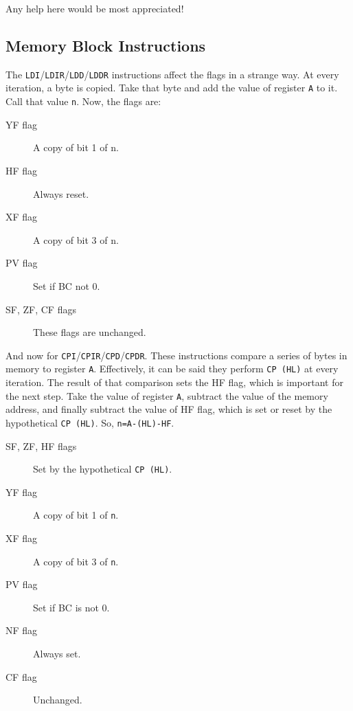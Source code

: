 Any help here would be most appreciated!


\subsection{Memory Block Instructions \cite{mrison}}
\label{block_mem}

The {\tt LDI}/{\tt LDIR}/{\tt LDD}/{\tt LDDR} instructions affect the flags in a strange way. At every iteration, a byte is copied. Take that byte and add the value of register {\tt A} to it. Call that value {\tt n}. Now, the flags are:

\begin{description}
 
	\item[YF flag]
	A copy of bit 1 of n.

	\item[HF flag]
	Always reset.

	\item[XF flag]
	A copy of bit 3 of n.

	\item[PV flag]
	Set if BC not 0.

	\item[SF, ZF, CF flags]
	These flags are unchanged.

\end{description}

And now for {\tt CPI}/{\tt CPIR}/{\tt CPD}/{\tt CPDR}. These instructions compare a series of bytes in memory to register {\tt A}. Effectively, it can be said they perform {\tt CP (HL)} at every iteration. The result of that comparison sets the HF flag, which is important for the next step. Take the value of register {\tt A}, subtract the value of the memory address, and finally subtract the value of HF flag, which is set or reset by the hypothetical {\tt CP (HL)}. So, {\tt n=A-(HL)-HF}.

\begin{description}

	\item[SF, ZF, HF flags]
	Set by the hypothetical {\tt CP (HL)}.

	\item[YF flag]
	A copy of bit 1 of {\tt n}.

	\item[XF flag]
	A copy of bit 3 of {\tt n}.

	\item[PV flag]
	Set if BC is not 0.

	\item[NF flag]
	Always set.

	\item[CF flag]
	Unchanged.

\end{description}


